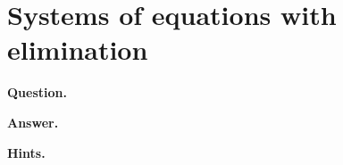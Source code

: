 \documentclass{article}
\begin{document}
\section*{Systems of equations with elimination}
\textbf{Question.} 

\textbf{Answer.} 

\textbf{Hints.}
\begin{itemize}

\end{itemize}
\end{document}
